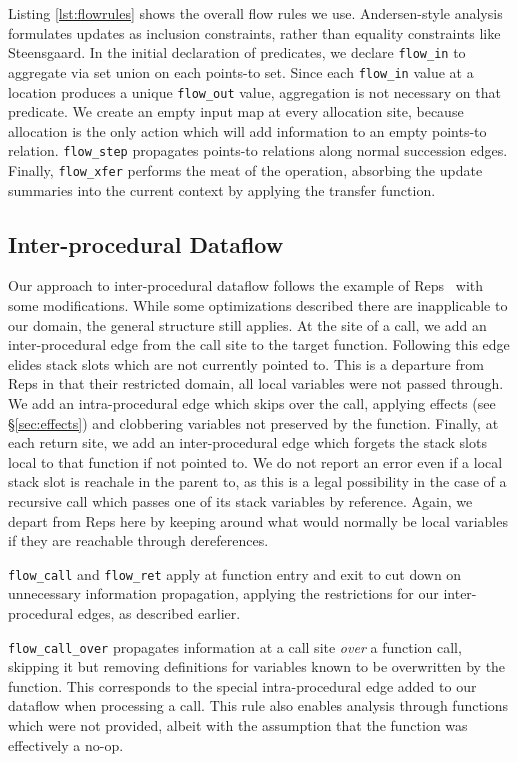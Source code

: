 Listing \ref{lst:flowrules} shows the overall flow rules we use.
Andersen-style analysis formulates updates as inclusion constraints, rather than equality constraints like Steensgaard.
In the initial declaration of predicates, we declare \texttt{flow\_in} to aggregate via set union on each points-to set.
Since each \texttt{flow\_in} value at a location produces a unique \texttt{flow\_out} value, aggregation is not necessary on that predicate.
We create an empty input map at every allocation site, because allocation is the only action which will add information to an empty points-to relation.
\texttt{flow\_step} propagates points-to relations along normal succession edges.
Finally, \texttt{flow\_xfer} performs the meat of the operation, absorbing the update summaries into the current context by applying the transfer function.

\subsection{Inter-procedural Dataflow}
\label{sec:interproc}
Our approach to inter-procedural dataflow follows the example of Reps~\cite{interproc-dataflow} with some modifications.
While some optimizations described there are inapplicable to our domain, the general structure still applies.
At the site of a call, we add an inter-procedural edge from the call site to the target function.
Following this edge elides stack slots which are not currently pointed to.
This is a departure from Reps in that their restricted domain, all local variables were not passed through.
We add an intra-procedural edge which skips over the call, applying effects (see \S \ref{sec:effects}) and clobbering variables not preserved by the function.
Finally, at each return site, we add an inter-procedural edge which forgets the stack slots local to that function if not pointed to.
We do not report an error even if a local stack slot is reachale in the parent to, as this is a legal possibility in the case of a recursive call which passes one of its stack variables by reference.
Again, we depart from Reps here by keeping around what would normally be local variables if they are reachable through dereferences.

\texttt{flow\_call} and \texttt{flow\_ret} apply at function entry and exit to cut down on unnecessary information propagation, applying the restrictions for our inter-procedural edges, as described earlier.

\texttt{flow\_call\_over} propagates information at a call site \emph{over} a function call, skipping it but removing definitions for variables known to be overwritten by the function.
This corresponds to the special intra-procedural edge added to our dataflow when processing a call.
This rule also enables analysis through functions which were not provided, albeit with the assumption that the function was effectively a no-op.

